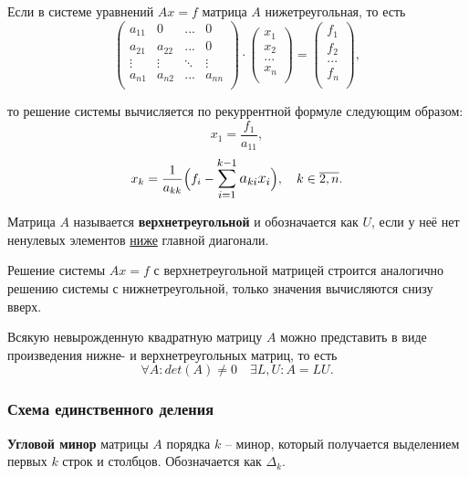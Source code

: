 \documentclass{article}
\begin{document}
Если в системе уравнений $Ax=f$ матрица $A$ нижетреугольная, то есть
\[
	\begin{pmatrix}
		a_{11}	& 0	& ...	& 0 \\
		a_{21}	& a_{22}& ...	& 0 \\
		\vdots	& \vdots&\ddots &\vdots \\
		a_{n1}	& a_{n2}& ...	& a_{nn} \\
	\end{pmatrix}
	\cdot
	\begin{pmatrix}
		x_1 \\
		x_2 \\
		... \\
		x_n \\
	\end{pmatrix}
	=
	\begin{pmatrix}
		f_1 \\
		f_2 \\
		... \\
		f_n \\
	\end{pmatrix}
	,
\]

то решение системы вычисляется по рекуррентной формуле следующим образом:
\[x_1=\frac{f_1}{a_{11}},\]
\[x_k=\frac{1}{a_{kk}}\Big(f_i-\mathlarger{\sum_{i=1}^{k-1}a_{ki}x_i}\Big),
\quad k\in\overline{2,n}.\]

\begin{define}
	Матрица $A$ называется \textbf{верхнетреугольной} и обозначается как
	$U$, если у неё нет ненулевых элементов \underline{ниже} главной
	диагонали.
\end{define}

Решение системы $Ax=f$ с верхнетреугольной матрицей строится аналогично решению
системы с нижнетреугольной, только значения вычисляются снизу вверх.

\begin{theorem}[об LU-разложении]
	Всякую невырожденную квадратную матрицу $A$ можно представить в виде
	произведения нижне- и верхнетреугольных матриц, то есть
	\[\forall A: det(A)\ne 0\quad\exists L,U: A=LU.\]
\end{theorem}

\subsubsection{Схема единственного деления}
\begin{define}
	\textbf{Угловой минор} матрицы $A$ порядка $k$ -- минор, который
	получается выделением первых $k$ строк и столбцов. Обозначается
	как $\Delta_k$.
\end{define}
\end{document}
